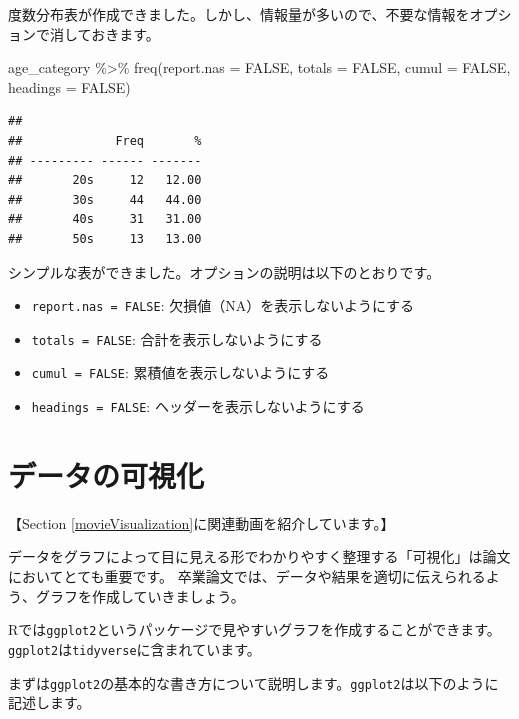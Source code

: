 \documentclass[
]{book}
\newenvironment{Shaded}{\begin{snugshade}}{\end{snugshade}}
\newcommand{\AttributeTok}[1]{\textcolor[rgb]{0.77,0.63,0.00}{#1}}
\newcommand{\ConstantTok}[1]{\textcolor[rgb]{0.00,0.00,0.00}{#1}}
\newcommand{\FunctionTok}[1]{\textcolor[rgb]{0.00,0.00,0.00}{#1}}
\newcommand{\NormalTok}[1]{#1}
\newcommand{\SpecialCharTok}[1]{\textcolor[rgb]{0.00,0.00,0.00}{#1}}
\providecommand{\tightlist}{%
  \setlength{\itemsep}{0pt}\setlength{\parskip}{0pt}}
\begin{document}
度数分布表が作成できました。しかし、情報量が多いので、不要な情報をオプションで消しておきます。

\begin{Shaded}
\begin{Highlighting}[]
\NormalTok{age\_category }\SpecialCharTok{\%\textgreater{}\%}
  \FunctionTok{freq}\NormalTok{(}\AttributeTok{report.nas =} \ConstantTok{FALSE}\NormalTok{, }\AttributeTok{totals =} \ConstantTok{FALSE}\NormalTok{, }\AttributeTok{cumul =} \ConstantTok{FALSE}\NormalTok{, }\AttributeTok{headings =} \ConstantTok{FALSE}\NormalTok{)}
\end{Highlighting}
\end{Shaded}

\begin{verbatim}
## 
##             Freq       %
## --------- ------ -------
##       20s     12   12.00
##       30s     44   44.00
##       40s     31   31.00
##       50s     13   13.00
\end{verbatim}

シンプルな表ができました。オプションの説明は以下のとおりです。

\begin{itemize}
\tightlist
\item
  \texttt{report.nas\ =\ FALSE}: 欠損値（NA）を表示しないようにする
\item
  \texttt{totals\ =\ FALSE}: 合計を表示しないようにする
\item
  \texttt{cumul\ =\ FALSE}: 累積値を表示しないようにする
\item
  \texttt{headings\ =\ FALSE}: ヘッダーを表示しないようにする
\end{itemize}

\hypertarget{Visualization}{%
\chapter{データの可視化}\label{Visualization}}

【Section \ref{movieVisualization}に関連動画を紹介しています。】

データをグラフによって目に見える形でわかりやすく整理する「可視化」は論文においてとても重要です。
卒業論文では、データや結果を適切に伝えられるよう、グラフを作成していきましょう。

Rでは\texttt{ggplot2}というパッケージで見やすいグラフを作成することができます。
\texttt{ggplot2}は\texttt{tidyverse}に含まれています。

まずは\texttt{ggplot2}の基本的な書き方について説明します。\texttt{ggplot2}は以下のように記述します。
\end{document}

